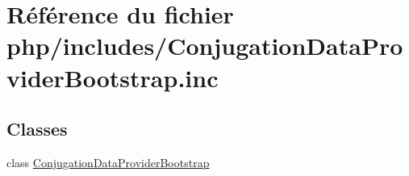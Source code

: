 \hypertarget{_conjugation_data_provider_bootstrap_8inc}{}\section{Référence du fichier php/includes/\+Conjugation\+Data\+Provider\+Bootstrap.inc}
\label{_conjugation_data_provider_bootstrap_8inc}
\subsection*{Classes}
\begin{DoxyCompactItemize}
\item 
class \hyperlink{class_conjugation_data_provider_bootstrap}{Conjugation\+Data\+Provider\+Bootstrap}
\end{DoxyCompactItemize}
